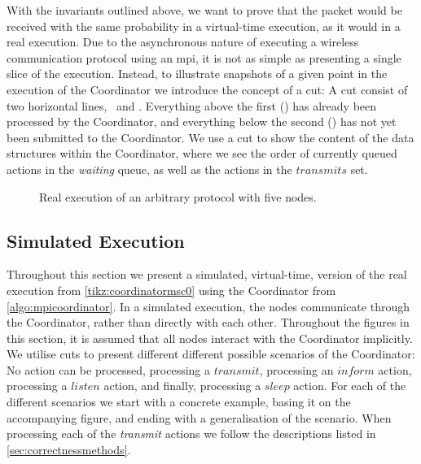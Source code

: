 With the invariants outlined above, we want to prove that the packet would be received with the same
probability in a virtual-time execution, as it would in a real execution. Due to the asynchronous nature
of executing a wireless communication protocol using an \gls{mpi}, it is not as simple as presenting a single
slice of the execution. Instead, to illustrate snapshots of a given point in the execution of the Coordinator
we introduce the concept of a cut: A cut consist of two horizontal lines, \ProcessedLine\ and \SubmittedLine.
Everything above the first (\ProcessedLine) has already been processed by the Coordinator, and everything
below the second (\SubmittedLine) has not yet been submitted to the Coordinator. We use a cut to show the
content of the data structures within the Coordinator, where we see the order of currently queued actions in
the \textit{waiting} queue, as well as the actions in the $\mathit{transmits}$ set.

\begin{figure}[H]
    \centering
    \caption{Real execution of an arbitrary protocol with five nodes.}\label{tikz:coordinatormsc0}
\end{figure}

\subsection{Simulated Execution}
Throughout this section we present a simulated, virtual-time, version of the real execution from
\autoref{tikz:coordinatormsc0} using the Coordinator from \autoref{algo:mpicoordinator}. In a simulated
execution, the nodes communicate through the Coordinator, rather than directly with each other.
Throughout the figures in this section, it is assumed that all nodes interact with the Coordinator implicitly.
We utilise cuts to present different different possible scenarios of the Coordinator: No action can be
processed, processing a $\mathit{transmit}$, processing an $\mathit{inform}$ action, processing a
$\mathit{listen}$ action, and finally, processing a $\mathit{sleep}$ action. For each of the different
scenarios we start with a concrete example, basing it on the accompanying figure, and ending with a
generalisation of the scenario. When processing each of the \textit{transmit} actions we follow the
descriptions listed in \autoref{sec:correctnessmethods}.


